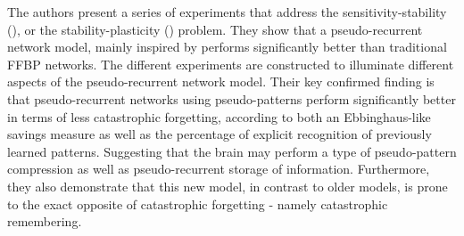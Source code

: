The authors present a series of experiments that address the sensitivity-stability (\cite{Hebb1949}), or the stability-plasticity (\cite{Carpenter1987}) problem. They show that a pseudo-recurrent network model, mainly inspired by \cite{McClelland1995} performs significantly better than traditional FFBP networks. The different experiments are constructed to illuminate different aspects of the pseudo-recurrent network model. Their key confirmed finding is that pseudo-recurrent networks using pseudo-patterns perform significantly better in terms of less catastrophic forgetting, according to both an Ebbinghaus-like savings measure as well as the percentage of explicit recognition of previously learned patterns. Suggesting that the brain may perform a type of pseudo-pattern compression as well as pseudo-recurrent storage of information. Furthermore, they also demonstrate that this new model, in contrast to older models, is prone to the exact opposite of catastrophic forgetting - namely catastrophic remembering.
